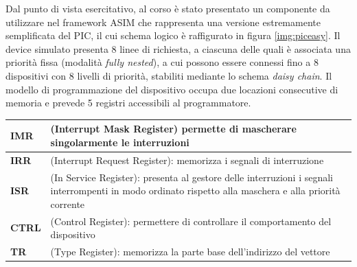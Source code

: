 Dal punto di vista esercitativo, al corso è stato presentato un componente da utilizzare nel framework ASIM che rappresenta una versione estremamente semplificata del PIC, il cui schema logico è raffigurato in figura \ref{img:piceasy}.
Il device simulato presenta 8 linee di richiesta, a ciascuna delle quali è associata una priorità fissa (modalità \textit{fully nested}), a cui possono essere connessi fino a 8 dispositivi con 8 livelli di priorità, stabiliti mediante lo schema \textit{daisy chain}. 
Il modello di programmazione del dispositivo occupa due locazioni consecutive di memoria e prevede 5 registri accessibili al programmatore. \\

\vspace{1cm}
\begin{tabular}{|p{3cm}|p{10cm}|}
    \hline
    \centering \textbf{IMR} &  (Interrupt Mask Register) permette di mascherare singolarmente le interruzioni \\
    \hline
    \centering \textbf{IRR} &  (Interrupt Request Register): memorizza i segnali di interruzione \\
    \hline
    \centering \textbf{ISR} &  (In Service Register): presenta al gestore delle interruzioni i segnali interrompenti in modo ordinato rispetto alla maschera e alla priorità corrente \\
    \hline
    \centering \textbf{CTRL} &  (Control Register): permettere di controllare il comportamento del dispositivo\\
    \hline
    \centering \textbf{TR} &  (Type Register): memorizza la parte base dell’indirizzo del vettore \\
    \hline
\end{tabular}

\vspace{1cm}


